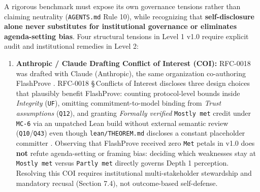 \documentclass[11pt,letterpaper]{article}
\begin{document}
A rigorous benchmark must expose its own governance tensions rather than claiming neutrality (\texttt{AGENTS.\allowbreak{}md} Rule 10), while recognizing that \textbf{self-disclosure alone never substitutes for institutional governance or eliminates agenda-setting bias}. Four structural tensions in Level 1 v1.0 require explicit audit and institutional remedies in Level 2:

\begin{enumerate}
\item \textbf{Anthropic / Claude Drafting Conflict of Interest (COI):} RFC-0018 was drafted with Claude (Anthropic), the same organization co-authoring FlashProve \cite{rinberg2026flashprove}. RFC-0018 \S\,Conflicts of Interest discloses three design choices that plausibly benefit FlashProve: counting protocol-level bounds inside \textit{Integrity} (\texttt{UF}), omitting commitment-to-model binding from \textit{Trust assumptions} (\texttt{Q12}), and granting \textit{Formally verified} \texttt{Mostly met} credit under \texttt{MC-6} via an unpatched Lean build without external semantic review (\texttt{Q10}/\texttt{Q43}) even though \texttt{lean/\allowbreak{}THEOREM.\allowbreak{}md} discloses a constant placeholder committer \cite{iproofs2026}. Observing that FlashProve received zero \texttt{Met} petals in v1.0 does \textbf{not} refute agenda-setting or framing bias: deciding which weaknesses stay at \texttt{Mostly met} versus \texttt{Partly met} directly governs Depth 1 perception. Resolving this COI requires institutional multi-stakeholder stewardship and mandatory recusal (Section 7.4), not outcome-based self-defense.

\end{enumerate}
\end{document}
